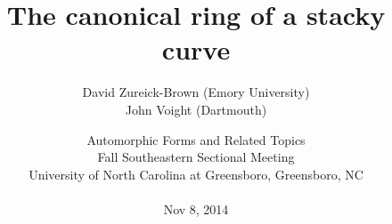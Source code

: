 
\title [The canonical ring of a stacky curve]{The canonical ring of a stacky curve}

\author[David Zureick-Brown and John Voight]{David Zureick-Brown (Emory University)
\\ John Voight (Dartmouth)}




\date[Nov 8, 2014]{Automorphic Forms and Related Topics\\ 
Fall Southeastern Sectional Meeting\\
 University of North Carolina at Greensboro, Greensboro, NC\\
\mbox{}\\
Nov 8, 2014\\
\mbox{}\\
}


\begin{frame}[plain]
  \titlepage
\end{frame}




